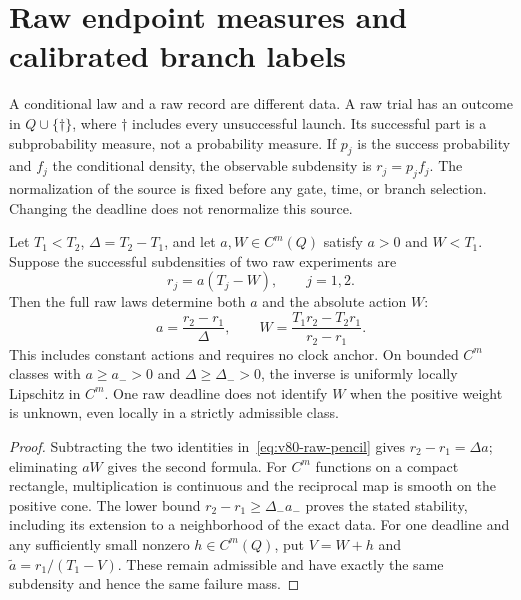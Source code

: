 \section{Raw endpoint measures and calibrated branch labels}
\label{sec:v80-raw}

A conditional law and a raw record are different data.  A raw trial has
an outcome in $Q\cup\{\dagger\}$, where $\dagger$ includes every
unsuccessful launch.  Its successful part is a subprobability measure,
not a probability measure.  If $p_j$ is the success probability and $f_j$
the conditional density, the observable subdensity is $r_j=p_jf_j$.
The normalization of the source is fixed before any gate, time, or
branch selection.  Changing the deadline does not renormalize this source.

\begin{theorem}\label{thm:v80-two-raw}
Let $T_1<T_2$, $\Delta=T_2-T_1$, and let $a,W\in C^m(Q)$ satisfy
$a>0$ and $W<T_1$.  Suppose the successful subdensities of two raw
experiments are
\begin{equation}\label{eq:v80-raw-pencil}
                 r_j=a(T_j-W),\qquad j=1,2.
\end{equation}
Then the full raw laws determine both $a$ and the absolute action $W$:
\begin{equation}\label{eq:v80-two-inverse}
 a=\frac{r_2-r_1}{\Delta},\qquad
 W=\frac{T_1r_2-T_2r_1}{r_2-r_1}.
\end{equation}
This includes constant actions and requires no clock anchor.  On bounded
$C^m$ classes with $a\ge a_->0$ and $\Delta\ge\Delta_->0$, the inverse
is uniformly locally Lipschitz in $C^m$.  One raw deadline does not
identify $W$ when the positive weight is unknown, even locally in a
strictly admissible class.
\end{theorem}
\begin{proof}
Subtracting the two identities in~\eqref{eq:v80-raw-pencil} gives
$r_2-r_1=\Delta a$; eliminating $aW$ gives the second formula.
For $C^m$ functions on a compact rectangle, multiplication is continuous
and the reciprocal map is smooth on the positive cone.  The lower bound
$r_2-r_1\ge\Delta_-a_-$ proves the stated stability, including its
extension to a neighborhood of the exact data.  For one deadline and
any sufficiently small nonzero $h\in C^m(Q)$, put
$V=W+h$ and $\widetilde a=r_1/(T_1-V)$.  These remain admissible and
have exactly the same subdensity and hence the same failure mass.
\end{proof}

